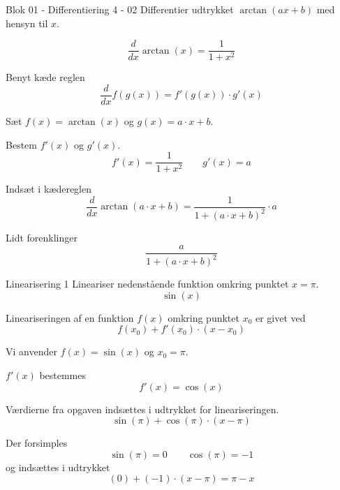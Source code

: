 \documentclass{article}
\begin{document}
\begin{exercise}{Blok 01 - Differentiering 4 - 02}
Differentier udtrykket $\arctan\left( a x + b \right)$ med hensyn til $x$.


\hint
\[
\frac{d}{dx} \arctan(x) = \frac{1}{1 + x^ 2}
\]


\hint
Benyt kæde reglen
\[
\frac{d}{dx} f(g(x)) = f'(g(x)) \cdot g'(x)
\]

\hint
Sæt $f(x) = \arctan(x)$ og $g(x) = a \cdot x + b$.

\hint
Bestem $f'(x)$ og $g'(x)$.
\[
f'(x) = \frac{1}{1 + x^ 2} \qquad g'(x) = a
\]

\hint
Indsæt i kædereglen
\[
\frac{d}{dx} \arctan\left( a \cdot x + b \right) = \frac{1}{1 + \left( a \cdot x + b \right)^2} \cdot a
\]

\hint
Lidt forenklinger
\[
\frac{a}{1 + \left( a \cdot x + b \right)^2}
\]
\end{exercise}


\begin{exercise}{Linearisering 1}
Lineariser nedenstående funktion omkring punktet $x = \pi$.
\[
\sin(x)
\]


\hint
Lineariseringen af en funktion $f(x)$
omkring punktet $x_0$ er givet ved
\[
f(x_0) + f'(x_0) \cdot (x - x_0)
\]

\hint
Vi anvender $f(x) = \sin(x)$ og $x_0 = \pi$.

\hint
$f'(x)$ bestemmes
\[
f'(x) = \cos(x)
\]

\hint
Værdierne fra opgaven indsættes i udtrykket for lineariseringen.
\[
\sin(\pi) + \cos(\pi) \cdot (x - \pi)
\]

\hint
Der forsimples
\[
\sin(\pi) = 0 \qquad 
\cos(\pi) = -1
\]
og indsættes i udtrykket
\[
(0) + (-1) \cdot (x - \pi) = 
\pi - x
\]

\end{exercise}
\end{document}
